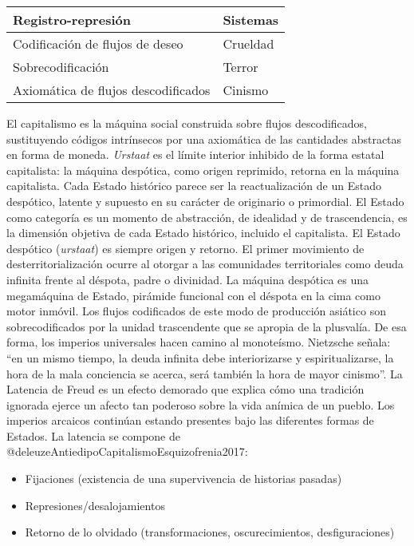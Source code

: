 \documentclass[
]{article}
\providecommand{\tightlist}{%
  \setlength{\itemsep}{0pt}\setlength{\parskip}{0pt}}
\begin{document}
\begin{longtable}[]{@{}ll@{}}
\toprule
\textbf{Registro-represión} & \textbf{Sistemas}\tabularnewline
\midrule
\endhead
Codificación de flujos de deseo & Crueldad\tabularnewline
Sobrecodificación & Terror\tabularnewline
Axiomática de flujos descodificados & Cinismo\tabularnewline
\bottomrule
\end{longtable}

El capitalismo es la máquina social construida sobre flujos
descodificados, sustituyendo códigos intrínsecos por una axiomática de
las cantidades abstractas en forma de moneda. \emph{Urstaat} es el
límite interior inhibido de la forma estatal capitalista: la máquina
despótica, como origen reprimido, retorna en la máquina capitalista.
Cada Estado histórico parece ser la reactualización de un Estado
despótico, latente y supuesto en su carácter de originario o primordial.
El Estado como categoría es un momento de abstracción, de idealidad y de
trascendencia, es la dimensión objetiva de cada Estado histórico,
incluido el capitalista. El Estado despótico (\emph{urstaat}) es siempre
origen y retorno. El primer movimiento de desterritorialización ocurre
al otorgar a las comunidades territoriales como deuda infinita frente al
déspota, padre o divinidad. La máquina despótica es una megamáquina de
Estado, pirámide funcional con el déspota en la cima como motor inmóvil.
Los flujos codificados de este modo de producción asiático son
sobrecodificados por la unidad trascendente que se apropia de la
plusvalía. De esa forma, los imperios universales hacen camino al
monoteísmo. Nietzsche señala: ``en un mismo tiempo, la deuda infinita
debe interiorizarse y espiritualizarse, la hora de la mala conciencia se
acerca, será también la hora de mayor cinismo''. La Latencia de Freud es
un efecto demorado que explica cómo una tradición ignorada ejerce un
afecto tan poderoso sobre la vida anímica de un pueblo. Los imperios
arcaicos continúan estando presentes bajo las diferentes formas de
Estados. La latencia se compone de
@deleuzeAntiedipoCapitalismoEsquizofrenia2017:

\begin{itemize}
\tightlist
\item
  Fijaciones (existencia de una supervivencia de historias pasadas)
\item
  Represiones/desalojamientos
\item
  Retorno de lo olvidado (transformaciones, oscurecimientos,
  desfiguraciones)
\end{itemize}
\end{document}
